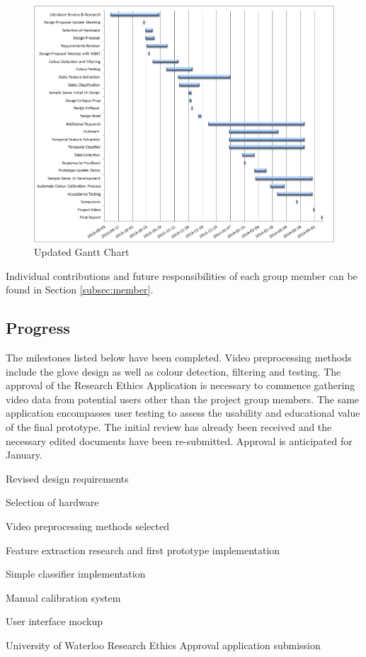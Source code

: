 \documentclass[12pt]{article}
\begin{document}
\begin{figure}[h!]
  \centering
  \includegraphics[scale=1]{Gantt.png}
  \caption{Updated Gantt Chart}
  \label{fig:gantt}
\end{figure}

Individual contributions and future responsibilities of each group member can be found in Section \ref{subsec:member}.

\subsection{Progress}
The milestones listed below have been completed. Video preprocessing methods include the glove design as well as colour detection, filtering and testing. The approval of the Research Ethics Application is necessary to commence gathering video data from potential users other than the project group members. The same application encompasses user testing to assess the usability and educational value of the final prototype. The initial review has already been received and the necessary edited documents have been re-submitted. Approval is anticipated for January.

\begin{enumerate*}
  \item Revised design requirements
  \item Selection of hardware
  \item Video preprocessing methods selected
  \item Feature extraction research and first prototype implementation
  \item Simple classifier implementation
  \item Manual calibration system
  \item User interface mockup
  \item University of Waterloo Research Ethics Approval application submission
\end{enumerate*}
\end{document}
